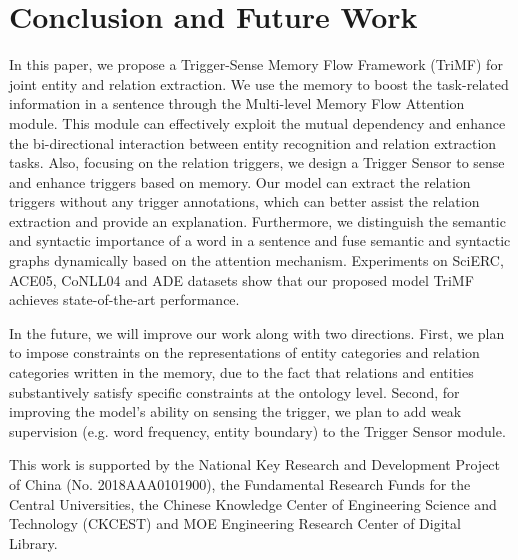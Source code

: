 \documentclass[sigconf]{acmart}
\begin{document}
\section{Conclusion and Future Work}


In this paper, we propose a Trigger-Sense Memory Flow Framework (TriMF) for joint entity and relation extraction. We use the memory to boost the task-related information in a sentence through the Multi-level Memory Flow Attention module. This module can effectively exploit the mutual dependency and enhance the bi-directional interaction between entity recognition and relation extraction tasks. Also, focusing on the relation triggers, we design a Trigger Sensor to sense and enhance triggers based on memory. Our model can extract the relation triggers without any trigger annotations, which can better assist the relation extraction and provide an explanation. Furthermore, we distinguish the semantic and syntactic importance of a word in a sentence and fuse semantic and syntactic graphs dynamically based on the attention mechanism. Experiments on SciERC, ACE05, CoNLL04 and ADE datasets show that our proposed model TriMF achieves state-of-the-art performance.


In the future, we will improve our work along with two directions. First, we plan to impose constraints on the representations of entity categories and relation categories written in the memory, due to the fact that relations and entities substantively satisfy specific constraints at the ontology level. Second, for improving the model's ability on sensing the trigger, we plan to add weak supervision (e.g. word frequency, entity boundary) to the Trigger Sensor module.


\begin{acks}
This work is supported by the National Key Research and Development Project of China (No. 2018AAA0101900), the Fundamental Research
Funds for the Central Universities, the Chinese Knowledge Center of Engineering Science and Technology (CKCEST) and MOE Engineering Research Center of Digital Library.

\end{acks}




\end{document}
